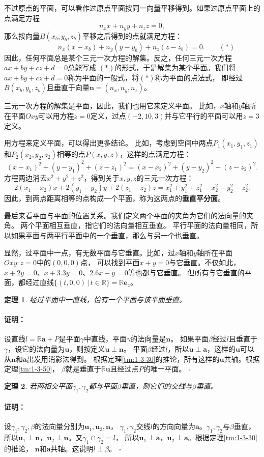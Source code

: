 \documentclass[12pt,UTF8]{ctexbook}
\newtheorem{tm}{定理}[section]
\renewenvironment{proof}{\paragraph{\textbf{证明：}}}{\hfill$\square$}
\begin{document}
不过原点的平面，可以看作过原点平面按同一向量平移得到。如果过原点平面上的点满足方程
$$ n_xx + n_yy + n_zz = 0, $$
那么按向量$B(x_b, y_b,z_b)$平移之后得到的点就满足方程：
$$ \mbox{}\qquad\qquad n_x(x - x_b) + n_y(y - y_b) + n_z(z - z_b) = 0. \quad\quad (*)$$
因此，任何平面总是某个三元一次方程的解集。反之，任何三元一次方程$ax+by+cz+d = 0$总能写成
$(*)$的形式，于是解集为某个平面。我们将$ax+by+cz+d = 0$称为平面的一般式，将$(*)$称为平面的点法式，
即经过$B(x_b, y_b,z_b)$且垂直于向量$\mathbf{n} = (n_x, n_y, n_z)$。

三元一次方程的解集是平面，因此，我们也用它来定义平面。
比如，$x$轴和$y$轴所在平面$Oxy$可以用方程$z = 0$定义，过点$(-2,10,3)$并与它平行的平面可以用$z = 3$定义。	

用方程来定义平面，可以得出更多结论。
比如，考虑到空间中两点$P_1(x_1, y_1, z_1)$和$P_2(x_2, y_2, z_2)$相等的点$P(x,y,z)$，这样的点满足方程：
$$ (x - x_1)^2 + (y - y_1)^2 + (z - z_1)^2 = (x - x_2)^2 + (y - y_2)^2 + (z - z_2)^2. $$
方程两边消去$x^2 + y^2 + z^2$，得到关于$x,y,z$的三元一次方程：
$$ 2(x_1-x_2)x + 2(y_1-y_2)y + 2(z_1-z_2)z = x_1^2+y_1^2+z_1^2 - x_2^2-y_2^2-z_2^2. $$
因此，到两点距离相等的点构成一个平面，称为这两点的\textbf{垂直平分面}。

最后来看平面与平面的位置关系。我们定义两个平面的夹角为它们的法向量的夹角。
两个平面相互垂直，指它们的法向量相互垂直。
平行平面的法向量相同，所以如果平面与两平行平面中的一个垂直，那么与另一个也垂直。

显然，过平面中一点，有无数平面与它垂直。比如，过$x$轴和$y$轴所在平面$Oxy: z = 0$中的$(0,0,0)$点，
可以找到平面$x + y = 0$与它垂直。不仅如此，$x + 2y = 0$、$x + 3.3y = 0$、$2.6x - y = 0$等也都与它垂直。
但所有与它垂直的平面，都经过直线$\{(t,0,0) \, | \, t\in \mathbb{R}\} = \mathbb{R}\mathbf{e}_z$。
\begin{tm}
    经过平面中一直线，恰有一个平面与该平面垂直。    
\end{tm}
\begin{proof}
    设直线$l = \mathbb{R}\mathbf{a} + P$是平面$\gamma$中直线，平面$\gamma$的法向量是$\mathbf{n}$。
    如果平面$\beta$经过$l$且垂直于$\gamma$，设它的法向量为$\mathbf{u}$，则按定义$\mathbf{u}\perp\mathbf{n}$。
    平面$\beta$经过$l$，所以$\mathbf{u}\perp\mathbf{a}$，这样的$\mathbf{u}$可以从$\mathbf{n}$和$\mathbf{a}$出发用消影法得到。
    根据定理\ref{tm:1-3-30}的推论，所有这样的$\mathbf{u}$共轴。根据定理\ref{tm:1-3-50}，
    $\beta$就是垂直于$\mathbb{R}\mathbf{u}$且经过点$P$的唯一平面。
\end{proof}
\begin{tm}
    若两相交平面$\gamma_1,\gamma_2$都与平面$\beta$垂直，则它们的交线与$\beta$垂直。
\end{tm}
\begin{proof}
    设$\gamma_1,\gamma_2,\beta$的法向量分别为$\mathbf{u}_1,\mathbf{u}_2,\mathbf{n}$，
    $\gamma_1,\gamma_2$交线$l$的方向向量为$\mathbf{a}$。$\gamma_1,\gamma_2$与$\beta$垂直，
    所以$\mathbf{u}_1\perp\mathbf{n}$，$\mathbf{u}_2\perp\mathbf{n}$。又$\gamma_1\cap\gamma_2=l$，
    所以$\mathbf{u}_1\perp\mathbf{a}$，$\mathbf{u}_2\perp\mathbf{a}$。根据定理\ref{tm:1-3-30}的推论，
    $\mathbf{n}$和$\mathbf{a}$共轴。这说明$l\perp\beta$。
\end{proof}
\end{document}
